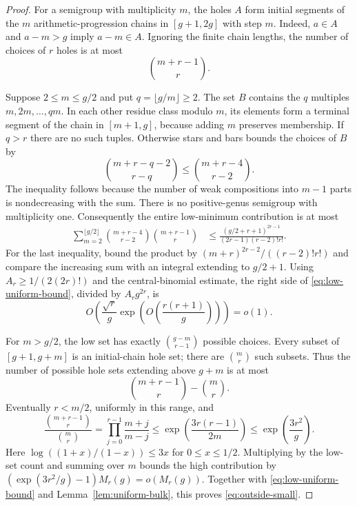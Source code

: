 \documentclass[11pt]{article}
\theoremstyle{remark}\newtheorem{remark}[theorem]{Remark}
\begin{document}
\begin{proof}
For a semigroup with multiplicity $m$, the holes $A$ form initial
segments of the $m$ arithmetic-progression chains in $[g+1,2g]$ with
step $m$. Indeed, $a\in A$ and $a-m>g$ imply $a-m\in A$. Ignoring
the finite chain lengths, the number of choices of $r$ holes is at most
\begin{equation}\label{eq:hole-chain-bound}
\binom{m+r-1}{r}.
\end{equation}

Suppose $2\le m\le g/2$ and put $q=\lfloor g/m\rfloor\ge2$.
The set $B$ contains the $q$ multiples $m,2m,\ldots,qm$. In each
other residue class modulo $m$, its elements form a terminal segment
of the chain in $[m+1,g]$, because adding $m$ preserves membership.
If $q>r$ there are no such tuples. Otherwise stars and bars bounds
the choices of $B$ by
\[
\binom{m+r-q-2}{r-q}\le\binom{m+r-4}{r-2}.
\]
The inequality follows because the number of weak compositions into
$m-1$ parts is nondecreasing with the sum. There is no positive-genus
semigroup with multiplicity one. Consequently the entire low-minimum
contribution is at most
\begin{equation}\label{eq:low-uniform-bound}
\begin{split}
\sum_{m=2}^{\lfloor g/2\rfloor}
 \binom{m+r-4}{r-2}\binom{m+r-1}{r}
&\le\frac{(g/2+r+1)^{2r-1}}{(2r-1)(r-2)!r!}.
\end{split}
\end{equation}
For the last inequality, bound the product by
$(m+r)^{2r-2}/((r-2)!r!)$ and compare the increasing sum with an
integral extending to $g/2+1$.
Using $A_r\ge1/(2(2r)!)$ and the central-binomial estimate, the right
side of \eqref{eq:low-uniform-bound}, divided by $A_rg^{2r}$, is
\[
O\left(\frac{\sqrt r}{g}
 \exp\left(O\left(\frac{r(r+1)}g\right)\right)\right)=o(1).
\]

For $m>g/2$, the low set has exactly $\binom{g-m}{r-1}$ possible
choices. Every subset of $[g+1,g+m]$ is an initial-chain hole set;
there are $\binom mr$ such subsets. Thus the number of possible hole
sets extending above $g+m$ is at most
\[
\binom{m+r-1}{r}-\binom mr.
\]
Eventually $r<m/2$, uniformly in this range, and
\[
\frac{\binom{m+r-1}{r}}{\binom mr}
=\prod_{j=0}^{r-1}\frac{m+j}{m-j}
\le\exp\left(\frac{3r(r-1)}{2m}\right)
\le\exp\left(\frac{3r^2}{g}\right).
\]
Here $\log((1+x)/(1-x))\le3x$ for $0\le x\le1/2$.
Multiplying by the low-set count and summing over $m$ bounds the high
contribution by $(\exp(3r^2/g)-1)M_r(g)=o(M_r(g))$. Together with
\eqref{eq:low-uniform-bound} and Lemma~\ref{lem:uniform-bulk}, this
proves \eqref{eq:outside-small}.
\end{proof}
\end{document}
